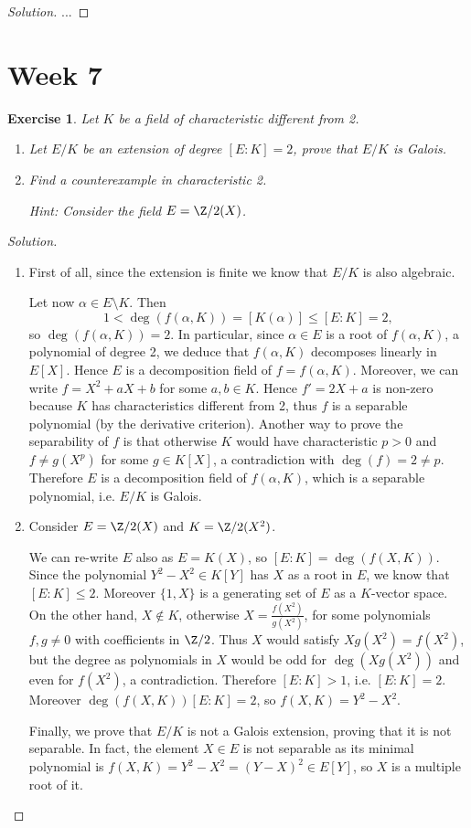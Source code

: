 \documentclass[a4paper,10pt,reqno]{amsart}
\newtheorem{ex}{Exercise}[section]
\newenvironment{sol}
  {\renewcommand\qedsymbol{$\blacksquare$}\begin{proof}[Solution]}
  {\end{proof}}
\begin{document}
\begin{sol}
...
\end{sol}



\newpage

\section{Week 7}


\begin{ex}
\label{7.1}
    Let $K$ be a field of characteristic different from 2. 
    \begin{enumerate}
        \item  Let $E/K$ be an extension of degree $[E:K]=2$, prove that $E/K$ is Galois.
        \item Find a counterexample in characteristic 2.
        
        \noindent \textit{Hint: }Consider the field $E=\Z/2(X)$. 
    \end{enumerate}
\end{ex}
\begin{sol}~
\begin{enumerate}
    \item First of all, since the extension is finite we know that 
$E/K$ is also algebraic.

Let now $\alpha \in E\setminus K$.
Then 
$$1<\deg(f(\alpha,K))=[K(\alpha)]\leq [E:K]=2,$$
so $\deg(f(\alpha,K))=2$.
In particular, since $\alpha\in E$ is a root of $f(\alpha,K)$, 
a polynomial of degree 2,
we deduce that $f(\alpha,K)$
decomposes linearly in $E[X]$.
Hence $E$ is a decomposition field
of $f=f(\alpha,K)$.
Moreover, we can write $f=X^2+aX+b$ for some $a,b\in K$.
Hence $f'=2X+a$ is non-zero because $K$ has characteristics different from 2,
thus $f$ is a separable polynomial (by the derivative criterion).
Another way to prove the separability of $f$
is that otherwise $K$ would have characteristic $p>0$
and $f\neq g(X^p)$ for some $g\in K[X]$,
a contradiction with $\deg(f)=2\neq p$.
Therefore $E$ is a decomposition field of $f(\alpha,K)$, which is 
a separable polynomial, i.e. $E/K$ is Galois.
\item Consider $E=\Z/2(X)$ and $K=\Z/2(X^2)$.

We can re-write $E$ also as $E=K(X)$, so $[E:K]=\deg(f(X,K))$.
Since the polynomial $Y^2-X^2\in K[Y]$
has $X$ as a root in $E$, we know that $[E:K]\leq 2$.
Moreover $\{1,X\}$ is a generating set of $E$ as a $K$-vector space.
On the other hand, $X\notin K$, otherwise $X=\frac{f(X^2)}{g(X^2)}$, for some polynomials $f,g \neq 0$ with coefficients in $\Z/2$.
Thus $X$ would satisfy $Xg(X^2)=f(X^2)$,
but the degree as polynomials in $X$ would be odd for
$\deg(Xg(X^2))$ and even for $f(X^2)$, a contradiction.
Therefore $[E:K]>1$, i.e. $[E:K]=2$.
Moreover $\deg(f(X,K))[E:K]=2$, so $f(X,K)=Y^2-X^2$.

Finally, we prove that $E/K$ is not a Galois extension, proving that it is not separable.
In fact, the element $X\in E$ is not separable as its minimal polynomial is
$f(X,K)=Y^2-X^2=(Y-X)^2\in E[Y]$,
so $X$ is a multiple root of it. \qedhere
\end{enumerate}
\end{sol}
\end{document}
